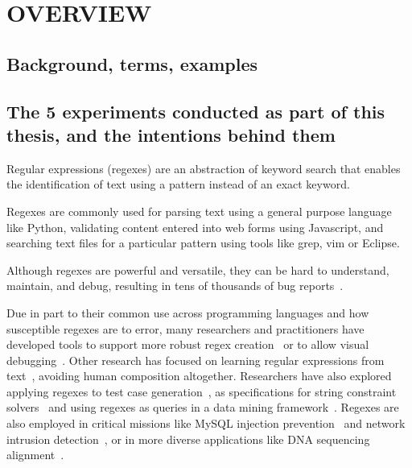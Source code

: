 \chapter{OVERVIEW}

\section{Background, terms, examples}

\section{The 5 experiments conducted as part of this thesis, and the intentions behind them}

Regular expressions (regexes) are an abstraction of keyword search that enables the identification of text using a pattern instead of an exact keyword.


Regexes are commonly used for parsing text using a general purpose language like Python, validating content entered into web forms using Javascript, and searching text files for a particular pattern using tools like grep, vim or Eclipse.



Although regexes are powerful and versatile, they can be hard to understand,  maintain, and debug, resulting in tens of thousands of bug reports~\cite{Spishak:2012:TSR:2318202.2318207}.

Due in part to their common use across programming languages and how susceptible regexes are to error, many researchers and practitioners have developed tools to support more robust regex creation~\cite{Spishak:2012:TSR:2318202.2318207} or to allow visual debugging~\cite{Beck:2014:RVD:2591062.2591111}. Other research has focused on learning regular expressions from  text~\cite{Babbar:2010:CBA:1871840.1871848, Li:2008:REL:1613715.1613719}, avoiding human composition altogether.
Researchers have also explored applying regexes to test case generation~\cite{Ghosh:2013:JAT:2486788.2486925, Galler:2014:STD:2683035.2683100, Anand:2013:OSM:2503903.2503991, Tillmann:2014:TAT:2642937.2642941},
as specifications for string constraint solvers~\cite{Trinh:2014:SSS:2660267.2660372, hampi} and using regexes as queries in a data mining framework~\cite{Begel:2010:CDE:1806799.1806821}.
Regexes are also employed in critical missions like MySQL injection prevention~\cite{Yeole:2011:ADT:1980022.1980229} and network intrusion detection~\cite{network}, or in more diverse applications like DNA sequencing alignment~\cite{1594922}.

